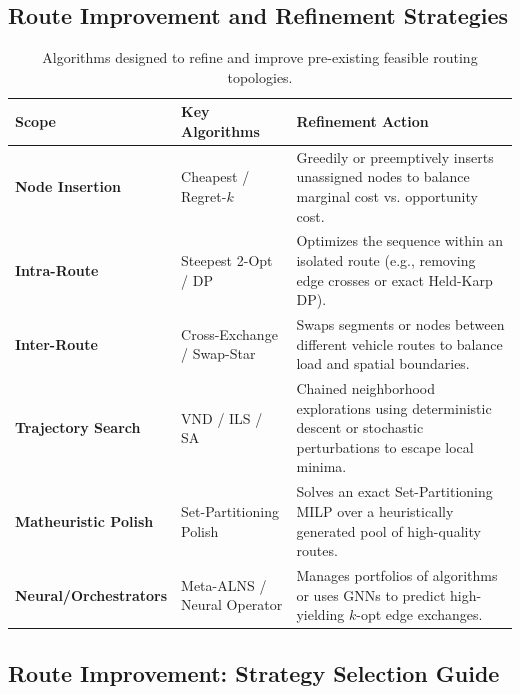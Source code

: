 \documentclass{article}
\begin{document}

\subsection*{Route Improvement and Refinement Strategies}

\begin{table}[H]
    \centering
    \caption{Algorithms designed to refine and improve pre-existing feasible routing topologies.}
    \begin{tabularx}{\textwidth}{@{} l l X @{}}
        \toprule
        \textbf{Scope} & \textbf{Key Algorithms} & \textbf{Refinement Action} \\
        \midrule
        \textbf{Node Insertion} & Cheapest / Regret-$k$ & Greedily or preemptively inserts unassigned nodes to balance marginal cost vs. opportunity cost. \\
        \textbf{Intra-Route} & Steepest 2-Opt / DP & Optimizes the sequence within an isolated route (e.g., removing edge crosses or exact Held-Karp DP). \\
        \textbf{Inter-Route} & Cross-Exchange / Swap-Star & Swaps segments or nodes between different vehicle routes to balance load and spatial boundaries. \\
        \textbf{Trajectory Search} & VND / ILS / SA & Chained neighborhood explorations using deterministic descent or stochastic perturbations to escape local minima. \\
        \textbf{Matheuristic Polish}& Set-Partitioning Polish & Solves an exact Set-Partitioning MILP over a heuristically generated pool of high-quality routes. \\
        \textbf{Neural/Orchestrators}& Meta-ALNS / Neural Operator & Manages portfolios of algorithms or uses GNNs to predict high-yielding $k$-opt edge exchanges. \\
        \bottomrule
    \end{tabularx}
\end{table}

\subsection*{Route Improvement: Strategy Selection Guide}
\end{document}
